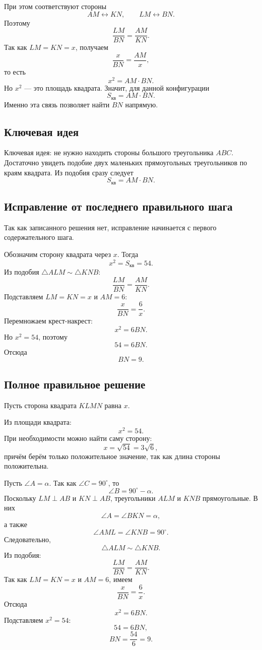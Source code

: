 \documentclass[12pt,a4paper]{article}
\begin{document}
При этом соответствуют стороны
\[
AM\leftrightarrow KN,\qquad LM\leftrightarrow BN.
\]
Поэтому
\[
\frac{LM}{BN}=\frac{AM}{KN}.
\]
Так как $LM=KN=x$, получаем
\[
\frac{x}{BN}=\frac{AM}{x},
\]
то есть
\[
x^2=AM\cdot BN.
\]
Но $x^2$ --- это площадь квадрата. Значит, для данной конфигурации
\[
S_{\text{кв}}=AM\cdot BN.
\]
Именно эта связь позволяет найти $BN$ напрямую.

\subsection*{Ключевая идея}
\textcolor{blue!60!black}{Ключевая идея:} не нужно находить стороны большого треугольника $ABC$. Достаточно увидеть подобие двух маленьких прямоугольных треугольников по краям квадрата. Из подобия сразу следует
\[
S_{\text{кв}}=AM\cdot BN.
\]

\subsection*{Исправление от последнего правильного шага}
Так как записанного решения нет, исправление начинается с первого содержательного шага.

Обозначим сторону квадрата через $x$. Тогда
\[
x^2=S_{\text{кв}}=54.
\]
Из подобия $\triangle ALM\sim\triangle KNB$:
\[
\frac{LM}{BN}=\frac{AM}{KN}.
\]
Подставляем $LM=KN=x$ и $AM=6$:
\[
\frac{x}{BN}=\frac{6}{x}.
\]
Перемножаем крест-накрест:
\[
x^2=6BN.
\]
Но $x^2=54$, поэтому
\[
54=6BN.
\]
Отсюда
\[
BN=9.
\]

\subsection*{Полное правильное решение}
Пусть сторона квадрата $KLMN$ равна $x$.

Из площади квадрата:
\[
x^2=54.
\]
При необходимости можно найти саму сторону:
\[
x=\sqrt{54}=3\sqrt6,
\]
причём берём только положительное значение, так как длина стороны положительна.

Пусть $\angle A=\alpha$. Так как $\angle C=90^\circ$, то
\[
\angle B=90^\circ-\alpha.
\]
Поскольку $LM\perp AB$ и $KN\perp AB$, треугольники $ALM$ и $KNB$ прямоугольные. В них
\[
\angle A=\angle BKN=\alpha,
\]
а также
\[
\angle AML=\angle KNB=90^\circ.
\]
Следовательно,
\[
\triangle ALM\sim\triangle KNB.
\]
Из подобия:
\[
\frac{LM}{BN}=\frac{AM}{KN}.
\]
Так как $LM=KN=x$ и $AM=6$, имеем
\[
\frac{x}{BN}=\frac{6}{x}.
\]
Отсюда
\[
x^2=6BN.
\]
Подставляем $x^2=54$:
\[
54=6BN,
\]
\[
BN=\frac{54}{6}=9.
\]
\end{document}
